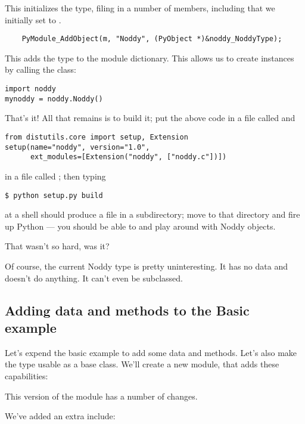 This initializes the  type, filing in a number of
members, including  that we initially set to \NULL.

\begin{verbatim}
    PyModule_AddObject(m, "Noddy", (PyObject *)&noddy_NoddyType);
\end{verbatim}

This adds the type to the module dictionary.  This allows us to create
 instances by calling the  class:

\begin{verbatim}
import noddy
mynoddy = noddy.Noddy()
\end{verbatim}

That's it!  All that remains is to build it; put the above code in a
file called  and

\begin{verbatim}
from distutils.core import setup, Extension
setup(name="noddy", version="1.0",
      ext_modules=[Extension("noddy", ["noddy.c"])])
\end{verbatim}

in a file called ; then typing

\begin{verbatim}
$ python setup.py build
\end{verbatim} %

at a shell should produce a file  in a subdirectory;
move to that directory and fire up Python --- you should be able to
 and play around with Noddy objects.

That wasn't so hard, was it?

Of course, the current Noddy type is pretty uninteresting. It has no
data and doesn't do anything. It can't even be subclassed.

\subsection{Adding data and methods to the Basic example}
    
Let's expend the basic example to add some data and methods.  Let's
also make the type usable as a base class. We'll create
a new module,  that adds these capabilities:



This version of the module has a number of changes.

We've added an extra include:

